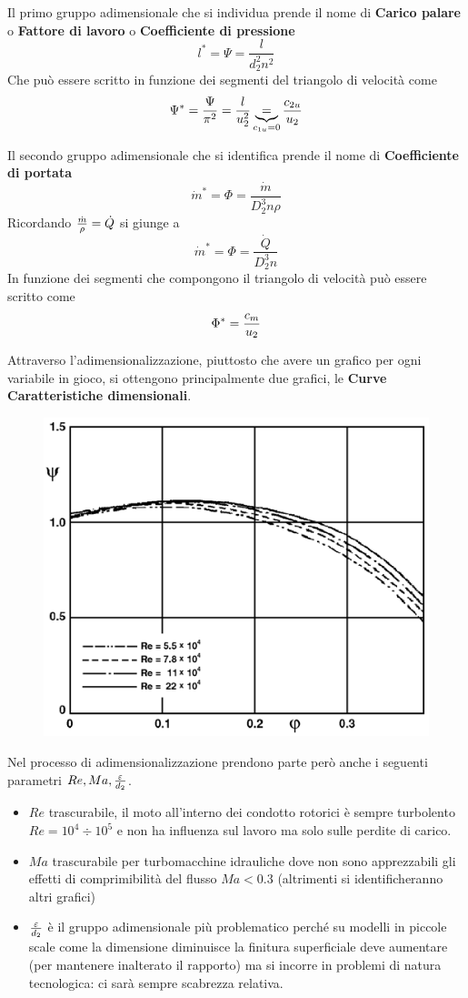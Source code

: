 \documentclass[a4paper, 15pt]{article}
\begin{document}
\begin{adjustwidth}{2in}{}
		Il primo gruppo adimensionale che si individua prende il nome di \textbf{Carico palare} o \textbf{Fattore di lavoro} o \textbf{Coefficiente di pressione}
		\begin{equation}\label{eq:19}
			\boxed{l^* = \Psi = \dfrac{l}{d_2^2n^2}}
		\end{equation}
		Che può essere scritto in funzione dei segmenti del triangolo di velocità come 
		\[\Psi^* = {\Psi\over\pi^2} = {l\over u_2^2} \underbrace{=}_{c_{1u}=0} {c_{2u}\over u_2} \]
		
		Il secondo gruppo adimensionale che si identifica prende il nome di \textbf{Coefficiente di portata}
		\begin{equation}\label{eq:1}
			\boxed{\dot{m}^* = \Phi = \dfrac{\dot{m}}{D_2^3n\rho}}
		\end{equation}
		Ricordando \({\dot{m}\over\rho} = \dot{Q}\) si giunge a
		\begin{equation}\label{eq:20}
			\boxed{\dot{m}^* = \Phi = \dfrac{\dot{Q}}{D_2^3n}}
		\end{equation}
		In funzione dei segmenti che compongono il triangolo di velocità può essere scritto come
		\[\Phi^* = {c_m\over u_2}\]
		
		Attraverso l'adimensionalizzazione, piuttosto che avere un grafico per ogni variabile in gioco, si ottengono principalmente due grafici, le \textbf{Curve Caratteristiche dimensionali}.	
\begin{figure}[H]
	\centering
	\includegraphics[width=0.3\linewidth]{immagini/curve}
	\label{fig:curve}
\end{figure}
		Nel processo di adimensionalizzazione prendono parte però anche i seguenti parametri $Re, Ma, {\varepsilon\over d_2}$. 
		\begin{itemize}
			\item $Re$ trascurabile, il moto all'interno dei condotto rotorici è sempre turbolento $Re = 10^4\div10^5$ e non ha influenza sul lavoro ma solo sulle perdite di carico. 
			\item $Ma$ trascurabile per turbomacchine idrauliche dove non sono apprezzabili gli effetti di comprimibilità del flusso $Ma<0.3$ (altrimenti si identificheranno altri grafici)
			\item ${\varepsilon\over d_2}$ è il gruppo adimensionale più problematico perché su modelli in piccole scale come la dimensione diminuisce la finitura superficiale deve aumentare (per mantenere inalterato il rapporto) ma si incorre in problemi di natura tecnologica: ci sarà sempre scabrezza relativa.
			

\end{itemize}
\end{adjustwidth}
\end{document}
